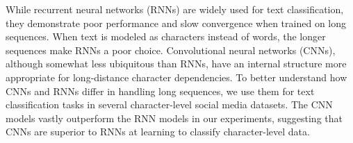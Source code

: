 While recurrent neural networks (RNNs) are widely used for text classification, they demonstrate poor performance and slow convergence when trained on long sequences. When text is modeled as characters instead of words, the longer sequences make RNNs a poor choice. Convolutional neural networks (CNNs), although somewhat less ubiquitous than RNNs, have an internal structure more appropriate for long-distance character dependencies. To better understand how CNNs and RNNs differ in handling long sequences, we use them for text classification tasks in several character-level social media datasets. The CNN models vastly outperform the RNN models in our experiments, suggesting that CNNs are superior to RNNs at learning to classify character-level data.
